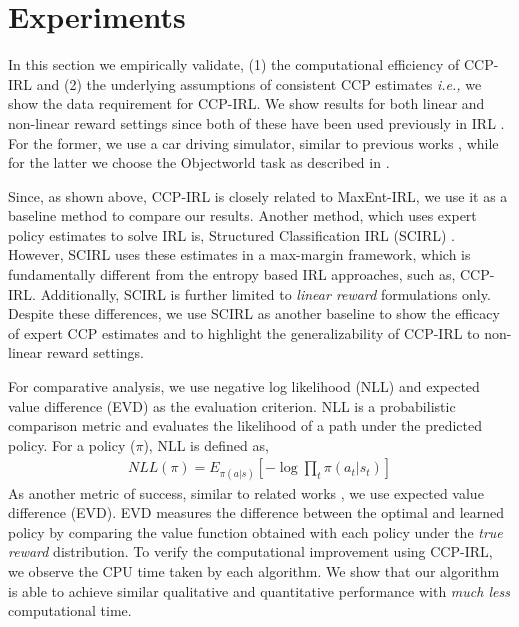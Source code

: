 \documentclass{article}
\begin{document}
\section{Experiments}

In this section we empirically validate, (1) the computational efficiency of CCP-IRL and (2) the underlying assumptions of consistent CCP estimates \emph{i.e.,} we show the data requirement for CCP-IRL.
We show results for both linear and non-linear reward settings since both of these have been used previously in IRL \cite{ziebart2010modeling, wulfmeier2015maximum}. For the former, we use a car driving simulator, similar to previous works \cite{abbeel2004apprenticeship, klein2012inverse}, while for the latter we choose the Objectworld task as described in \cite{Levine2013}.

 Since, as shown above, CCP-IRL is closely related to MaxEnt-IRL, we use it as a baseline method to compare our results. 
Another method, which uses expert policy estimates to solve IRL is, Structured Classification IRL (SCIRL) \cite{klein2012inverse}. However, SCIRL uses these estimates in a max-margin framework, which is fundamentally different from the entropy based IRL approaches, such as, CCP-IRL. Additionally, SCIRL is further limited to \textit{linear reward} formulations only.
Despite these differences, we use SCIRL as another baseline to show the efficacy of expert CCP estimates and to highlight the generalizability of CCP-IRL to non-linear reward settings.

 For comparative analysis, we use negative log likelihood (NLL) \cite{kitani2012activity} and expected value difference (EVD) \cite{levine2011nonlinear} as the evaluation criterion. NLL is a probabilistic comparison metric and evaluates the likelihood of a path under the predicted policy. For a policy ($\pi$), NLL is defined as,
\begin{align}
NLL(\pi) = E_{\pi(a|s)}\left[-\log \prod_{t} \pi(a_{t}|s_{t}) \right]
\end{align}
As another metric of success, similar to related works \cite{Levine2013, wulfmeier2015maximum}, we use expected value difference (EVD). EVD measures the difference between the optimal and learned policy by comparing the value function obtained with each policy under the \textit{true reward} distribution.
To verify the computational improvement using CCP-IRL, we observe the CPU time taken by each algorithm. We show that our algorithm is able to achieve similar qualitative and quantitative performance with \textit{much less} computational time.
\end{document}
